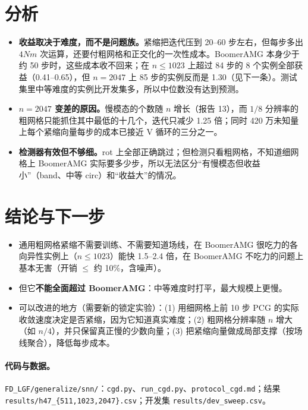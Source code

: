 \documentclass[11pt,a4paper]{ctexart}
\begin{document}
\section{分析}
\begin{itemize}
\item \textbf{收益取决于难度，而不是问题族。}紧缩把迭代压到 20--60 步左右，但每步多出 $4Nm$ 次运算，还要付粗网格和正交化的一次性成本。BoomerAMG 本身少于约 50 步时，这些成本收不回来；在 $n\le1023$ 上超过 84 步的 8 个实例全部获益（0.41--0.65），但 $n=2047$ 上 85 步的实例反而是 1.30（见下一条）。测试集里中等难度的实例比开发集多，所以中位数没有达到预测。
\item \textbf{$n=2047$ 变差的原因。}慢模态的个数随 $n$ 增长（报告 13），而 $1/8$ 分辨率的粗网格只能抓住其中最低的十几个，迭代只减少 1.25 倍；同时 420 万未知量上每个紧缩向量每步的成本已接近 V 循环的三分之一。
\item \textbf{检测器有效但不够细。}rot 上全部正确跳过；但检测只看粗网格，不知道细网格上 BoomerAMG 实际要多少步，所以无法区分“有慢模态但收益小”（band、中等 circ）和“收益大”的情况。
\end{itemize}

\section{结论与下一步}
\begin{itemize}
\item 通用粗网格紧缩不需要训练、不需要知道场线，在 BoomerAMG 很吃力的各向异性实例上（$n\le1023$）能快 1.5--2.4 倍，在 BoomerAMG 不吃力的问题上基本无害（开销 $\le$ 约 10\%，含噪声）。
\item 但它\textbf{不能全面超过 BoomerAMG}：中等难度时打平，最大规模上更慢。
\item 可以改进的地方（需要新的锁定实验）：(1) 用细网格上前 10 步 PCG 的实际收敛速度决定是否紧缩，因为它知道真实难度；(2) 粗网格分辨率随 $n$ 增大（如 $n/4$），并只保留真正慢的少数向量；(3) 把紧缩向量做成局部支撑（按场线聚合），降低每步成本。
\end{itemize}
\paragraph{代码与数据。}\texttt{FD\_LGF/generalize/snn/}：\texttt{cgd.py}、\texttt{run\_cgd.py}、\texttt{protocol\_cgd.md}；结果 \texttt{results/h47\_\{511,1023,2047\}.csv}；开发集 \texttt{results/dev\_sweep.csv}。
\end{document}
